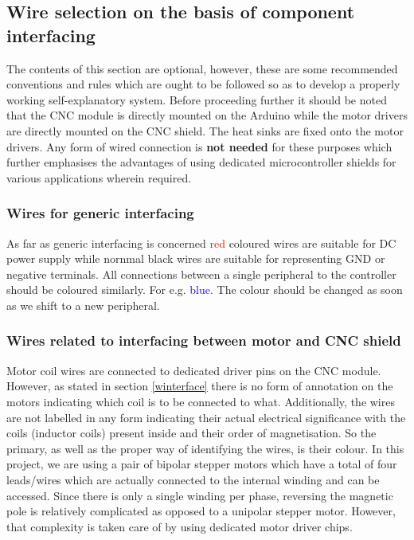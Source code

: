 \subsection{Wire selection on the basis of component interfacing}

The contents of this section are optional, however, these are some recommended conventions and rules which are ought to be followed so as to develop a properly working self-explanatory system. Before proceeding further it should be noted that the CNC module is directly mounted on the Arduino while the motor drivers are directly mounted on the CNC shield. The heat sinks are fixed onto the motor drivers. Any form of wired connection is \textbf{not needed} for these purposes which further emphasises the advantages of using dedicated microcontroller shields for various applications wherein required. 

\subsubsection*{Wires for generic interfacing}
As far as generic interfacing is concerned \textcolor{red}{red} coloured wires are suitable for DC power supply while nornmal black wires are suitable for representing GND or negative terminals. All connections between a single peripheral to the controller should be coloured similarly. For e.g. \textcolor{blue}{blue}. The colour should be changed as soon as we shift to a new peripheral.

\subsubsection*{Wires related to interfacing between motor and CNC shield}

Motor coil wires are connected to dedicated driver pins on the CNC module. However, as stated in section \ref{winterface} there is no form of annotation on the motors indicating which coil is to be connected to what. Additionally, the wires are not labelled in any form indicating their actual electrical significance with the coils (inductor coils) present inside and their order of magnetisation. So the primary, as well as the proper way of identifying the wires, is their colour. In this project, we are using a pair of bipolar stepper motors which have a total of four leads/wires which are actually connected to the internal winding and can be accessed. Since there is only a single winding per phase, reversing the magnetic pole is relatively complicated as opposed to a unipolar stepper motor. However, that complexity is taken care of by using dedicated motor driver chips. \par


